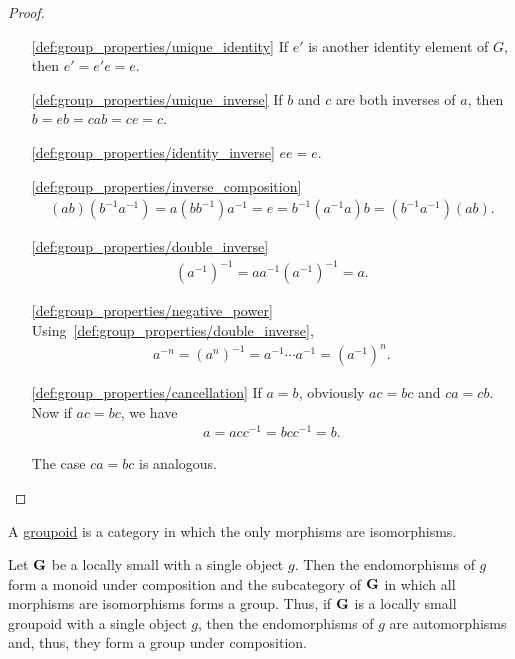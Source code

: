 \begin{proof}\mbox{}
  \begin{itemize}
    \item[\ref{def:group_properties/unique_identity}] If $e'$ is another identity element of $G$, then $e' = e' e = e$.
    \item[\ref{def:group_properties/unique_inverse}] If $b$ and $c$ are both inverses of $a$, then $b = eb = cab = ce = c$.
    \item[\ref{def:group_properties/identity_inverse}] $ee = e$.
    \item[\ref{def:group_properties/inverse_composition}]
    \begin{align*}
      (ab) (b^{-1} a^{-1})
      =
      a (b b^{-1}) a^{-1}
      =
      e
      =
      b^{-1} (a^{-1} a) b
      =
      (b^{-1} a^{-1}) (ab).
    \end{align*}

    \item[\ref{def:group_properties/double_inverse}]
    \begin{align*}
      (a^{-1})^{-1}
      =
      a a^{-1} (a^{-1})^{-1}
      =
      a.
    \end{align*}

    \item[\ref{def:group_properties/negative_power}] Using~\ref{def:group_properties/double_inverse},
    \begin{align*}
      a^{-n}
      =
      (a^n)^{-1}
      =
      a^{-1} \cdots a^{-1}
      =
      (a^{-1})^n.
    \end{align*}

    \item[\ref{def:group_properties/cancellation}] If $a = b$, obviously $ac = bc$ and $ca = cb$. Now if $ac = bc$, we have
    \begin{align*}
      a = acc^{-1} = bcc^{-1} = b.
    \end{align*}

    The case $ca = bc$ is analogous.
  \end{itemize}
\end{proof}

\begin{definition}\label{def:groupoid}
  A \uline{groupoid} is a category in which the only morphisms are isomorphisms.
\end{definition}

\begin{definition}\label{note:groupoids}
  Let $\operatorname{\mathbf{G}}$ be a locally small with a single object $g$. Then the endomorphisms of $g$ form a monoid under composition and the subcategory of $\operatorname{\mathbf{G}}$ in which all morphisms are isomorphisms forms a group. Thus, if $\operatorname{\mathbf{G}}$ is a locally small groupoid with a single object $g$, then the endomorphisms of $g$ are automorphisms and, thus, they form a group under composition.
\end{definition}

